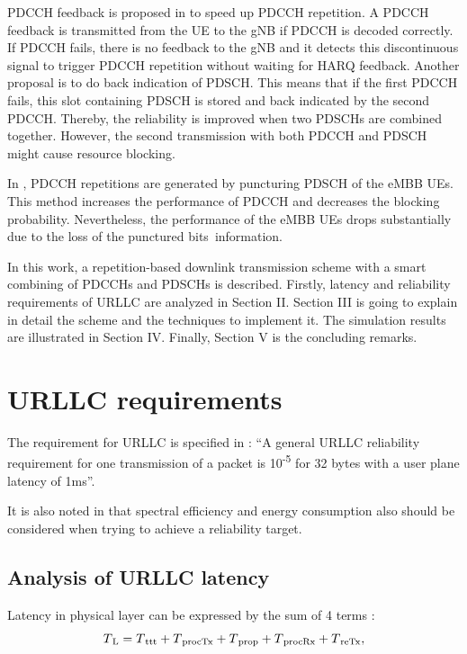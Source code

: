 \documentclass[conference,10pt]{IEEEtran}
\begin{document}
PDCCH feedback is proposed in \cite{b4} to speed up PDCCH repetition. A PDCCH feedback is transmitted from the UE to the gNB if PDCCH is decoded correctly. If PDCCH fails, there is no feedback to the gNB and it detects this discontinuous signal to trigger PDCCH repetition without waiting for HARQ feedback. Another proposal is to do back indication of PDSCH. This means that if the first PDCCH fails, this slot containing PDSCH is stored and back indicated by the second PDCCH. Thereby, the reliability is improved when two PDSCHs are combined together. However, the second transmission with both PDCCH and PDSCH might cause resource blocking.

In \cite{b5}, PDCCH repetitions are generated by puncturing PDSCH of the eMBB UEs. This method increases the performance of PDCCH and decreases the blocking probability. Nevertheless, the performance of the eMBB UEs drops substantially due to the loss of the punctured bits\textquotesingle \, information.

In this work, a repetition-based downlink transmission scheme with a smart combining of PDCCHs and PDSCHs is described. Firstly, latency and reliability requirements of URLLC are analyzed in Section II. Section III is going to explain in detail the scheme and the techniques to implement it. The simulation results are illustrated in Section IV. Finally, Section V is the concluding remarks.

\section{URLLC requirements}
The requirement for URLLC is specified in \cite{b6}: ``A general URLLC reliability requirement for one transmission of a packet is 10\textsuperscript{-5} for 32 bytes with a user plane latency of 1ms''.

It is also noted in \cite{b6} that spectral efficiency and energy consumption also should be considered when trying to achieve a reliability target. 
\subsection{Analysis of URLLC latency}
Latency in physical layer can be expressed by the sum of 4 terms \cite{ad1}:
\begin{equation}
T\textsubscript{L}= T\textsubscript{ttt} + T\textsubscript{procTx} + T\textsubscript{prop} + T\textsubscript{procRx} + T\textsubscript{reTx},\label{eq1}
\end{equation}
\end{document}
